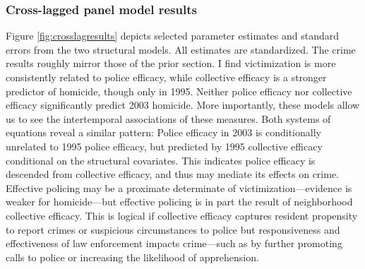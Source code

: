 \documentclass [11pt, proquest] {uwthesis}[2015/03/03]
\begin{document}
\hypertarget{cross-lagged-panel-model-results}{%
\subsubsection{Cross-lagged panel model results}\label{cross-lagged-panel-model-results}}

Figure \ref{fig:crosslagresults} depicts selected parameter estimates and standard errors from the two structural models. All estimates are standardized. The crime results roughly mirror those of the prior section. I find victimization is more consistently related to police efficacy, while collective efficacy is a stronger predictor of homicide, though only in 1995. Neither police efficacy nor collective efficacy significantly predict 2003 homicide. More importantly, these models allow us to see the intertemporal associations of these measures. Both systems of equations reveal a similar pattern: Police efficacy in 2003 is conditionally unrelated to 1995 police efficacy, but predicted by 1995 collective efficacy conditional on the structural covariates. This indicates police efficacy is descended from collective efficacy, and thus may mediate its effects on crime. Effective policing may be a proximate determinate of victimization---evidence is weaker for homicide---but effective policing is in part the result of neighborhood collective efficacy. This is logical if collective efficacy captures resident propensity to report crimes or suspicious circumstances to police but responsiveness and effectiveness of law enforcement impacts crime---such as by further promoting calls to police or increasing the likelihood of apprehension.
\end{document}
